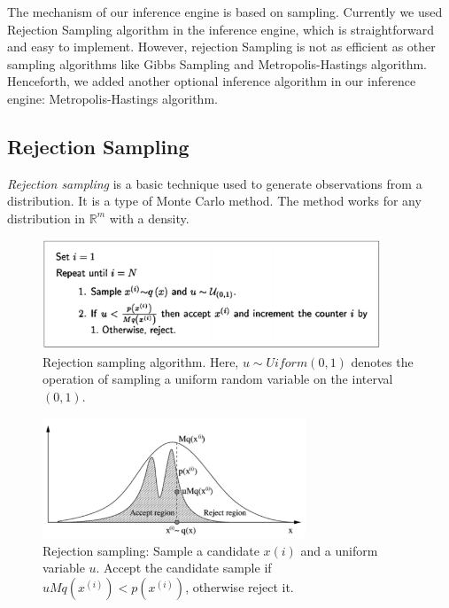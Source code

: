 The mechanism of our inference engine is based on sampling. Currently we used Rejection Sampling algorithm in the inference engine, which is straightforward and easy to implement. However, rejection Sampling is not as efficient as other sampling algorithms like Gibbs Sampling and Metropolis-Hastings algorithm. Henceforth, we added another optional inference algorithm in our inference engine: Metropolis-Hastings algorithm. 

\subsection{Rejection Sampling}
\textit{Rejection sampling} is a basic technique used to generate observations from a distribution. It is a type of Monte Carlo method. The method works for any distribution in $\mathbb{R}^m$ with a density.

\begin{figure}
    \centering
    \includegraphics[width=0.9\textwidth]{figures/rj1.png}
    \caption{Rejection sampling algorithm. Here, $u \sim Uiform(0,1)$ denotes the operation of sampling a uniform random variable on the interval $(0,1)$.}
    \label{fig:rj1}
\end{figure}

\begin{figure}
    \centering
    \includegraphics[width=0.7\textwidth]{figures/rj2.png}
    \caption{Rejection sampling: Sample a candidate $x(i)$ and a uniform variable $u$. Accept the candidate sample if $uMq(x^{(i)}) < p(x^{(i)})$, otherwise reject it.}
    \label{fig:rj2}
\end{figure}

